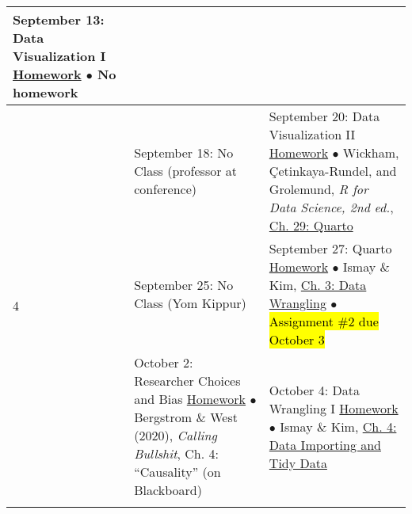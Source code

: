 \documentclass[12pt,letterpaper]{article}
\begin{document}
\begin{tabularx}{\textwidth}{|p{}|p{}||p{}|}
September 13: Data Visualization I \newline \newline
\ul{Homework} \newline
$\bullet$ No homework \\


\hline
\multirow{5}{*}{4} &

September 18: No Class (professor at conference) &

September 20: Data Visualization II \newline \newline
\ul{Homework} \newline
$\bullet$ Wickham, Çetinkaya-Rundel, and Grolemund, \emph{R for Data Science, 2nd ed.}, \href{https://r4ds.hadley.nz/quarto}{Ch. 29: Quarto} \\


\hline
\multirow{6}{*}{5} &

September 25: No Class (Yom Kippur) &

September 27: Quarto \newline \newline
\ul{Homework} \newline
$\bullet$ Ismay \& Kim, \href{https://moderndive.com/3-wrangling.html}{Ch. 3: Data Wrangling} 
$\bullet$ \hl{Assignment \#2 due October 3}\\


\hline
\multirow{6}{*}{6} &

October 2: Researcher Choices and Bias \newline \newline
\ul{Homework} \newline
$\bullet$ Bergstrom \& West (2020), \emph{Calling Bullshit}, Ch. 4: ``Causality'' (on Blackboard) &

October 4: Data Wrangling I \newline \newline
\ul{Homework} \newline
$\bullet$ Ismay \& Kim, \href{https://moderndive.com/4-tidy.html}{Ch. 4: Data Importing and Tidy Data} \\


\hline
\multirow{6}{*}{7} &


\end{tabularx}
\end{document}
